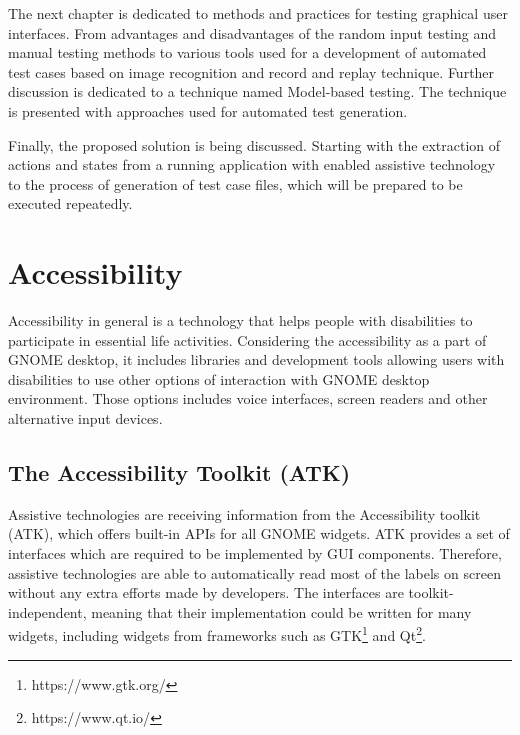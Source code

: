 The next chapter is dedicated to methods and practices for testing graphical user interfaces. From advantages and disadvantages of the random input testing and manual testing methods to various tools used for a development of automated test cases based on image recognition and record and replay technique. Further discussion is dedicated to a technique named Model-based testing. The technique is presented with approaches used for automated test generation. 

Finally, the proposed solution is being discussed. Starting with the extraction of actions and states from a running application with enabled assistive technology to the process of generation of test case files, which will be prepared to be executed repeatedly.

\chapter{Accessibility}
Accessibility in general is a technology that helps people with disabilities to participate in essential life activities. Considering the accessibility as a part of GNOME desktop, it includes libraries and development tools allowing users with disabilities to use other options of interaction with GNOME desktop environment. Those options includes voice interfaces, screen readers and other alternative input devices.\cite{gnomeADG}
\section{The Accessibility Toolkit (ATK)}
Assistive technologies are receiving information from the Accessibility toolkit (ATK), which offers built-in APIs for all GNOME widgets. ATK provides a set of interfaces which are required to be implemented by GUI components. Therefore, assistive technologies are able to automatically read most of the labels on screen without any extra efforts made by developers. The interfaces are toolkit-independent, meaning that their implementation could be written for many widgets, including widgets from frameworks such as GTK\footnote{https://www.gtk.org/} and Qt\footnote{https://www.qt.io/}.
